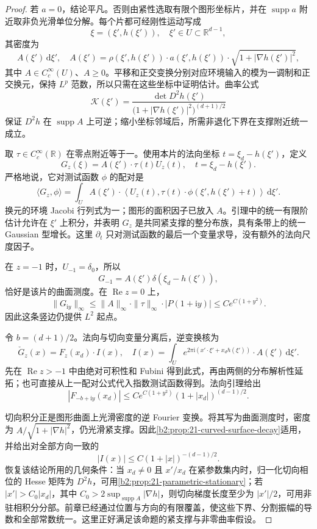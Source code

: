 \begin{proof}
若 \(a=0\)，结论平凡。否则由紧性选取有限个图形坐标片，并在 \(\operatorname{supp}a\) 附近取非负光滑单位分解。每个片都可经刚性运动写成
\[
 \xi=(\xi',h(\xi')),\quad \xi'\in U\subset\mathbb R^{d-1},
\]
其密度为
\[
 A(\xi')\,\mathrm d\xi',\quad
 A(\xi')=\rho(\xi',h(\xi'))\cdot
 a(\xi',h(\xi'))\cdot\sqrt{1+|\nabla h(\xi')|^2},
\]
其中 \(A\in C_c^\infty(U)\)、\(A\geq0\)。平移和正交变换分别对应环境输入的模为一调制和正交换元，保持 \(L^p\) 范数，所以只需在这些坐标中证明估计。曲率公式
\[
 \mathcal K(\xi')
 =\frac{\det D^2h(\xi')}
 {\bigl(1+|\nabla h(\xi')|^2\bigr)^{(d+1)/2}}
\]
保证 \(D^2h\) 在 \(\operatorname{supp}A\) 上可逆；缩小坐标邻域后，所需非退化下界在支撑附近统一成立。

取 \(\tau\in C_c^\infty(\mathbb R)\) 在零点附近等于一。使用本片的法向坐标
\(t=\xi_d-h(\xi')\)，定义
\[
 G_z(\xi)=A(\xi')\cdot\tau(t)U_z(t),
 \quad t=\xi_d-h(\xi').
\]
严格地说，它对测试函数 \(\phi\) 的配对是
\[
 \langle G_z,\phi\rangle
 =\int_U A(\xi')\cdot
 \left\langle U_z(t),
 \tau(t)\cdot\phi(\xi',h(\xi')+t)\right\rangle\,\mathrm d\xi'.
\]
换元的环境 Jacobi 行列式为一；图形的面积因子已放入 \(A\)。引理中的统一有限阶估计允许在 \(\xi'\) 上积分，并表明 \(G_z\) 是共同紧支撑的整分布族，具有条带上的统一 Gaussian 型增长。这里 \(\partial_t\) 只对测试函数的最后一个变量求导，没有额外的法向尺度因子。

在 \(z=-1\) 时，\(U_{-1}=\delta_0\)，所以
\[
 G_{-1}=A(\xi')\delta(\xi_d-h(\xi')),
\]
恰好是该片的曲面测度。在 \(\operatorname{Re}z=0\) 上，
\[
 \|G_{\mathrm iy}\|_\infty
 \leq\|A\|_\infty\cdot\|\tau\|_\infty
 \cdot|P(1+\mathrm iy)|
 \leq C e^{C(1+y^2)}.
\]
因此这条竖边仍提供 \(L^2\) 起点。

令 \(b=(d+1)/2\)。法向与切向变量分离后，逆变换核为
\[
 \check G_z(x)=F_z(x_d)\cdot I(x),
 \quad
 I(x)=\int_U e^{2\pi\mathrm i(x'\cdot\xi'+x_dh(\xi'))}
 \cdot A(\xi')\,\mathrm d\xi'.
\]
先在 \(\operatorname{Re}z>-1\) 中由绝对可积性和 Fubini 得到此式，再由两侧的分布解析性延拓；也可直接从上一配对公式代入指数测试函数得到。法向引理给出
\[
 |F_{-b+\mathrm iy}(x_d)|
 \leq C e^{C(1+y^2)}(1+|x_d|)^{(d-1)/2}.
\]

切向积分正是图形曲面上光滑密度的逆 Fourier 变换。将其写为曲面测度时，密度为 \(A/\sqrt{1+|\nabla h|^2}\)，仍光滑紧支撑。因此\cref{b2:prop:21-curved-surface-decay}适用，并给出对全部方向一致的
\[
 |I(x)|\leq C(1+|x|)^{-(d-1)/2}.
\]
恢复该结论所用的几何条件：当 \(x_d\ne0\) 且 \(x'/x_d\) 在紧参数集内时，归一化切向相位的 Hesse 矩阵为 \(D^2h\)，可用\cref{b2:prop:21-parametric-stationary}；若 \(|x'|>C_0|x_d|\)，其中 \(C_0>2\sup_{\operatorname{supp}A}|\nabla h|\)，则切向梯度长度至少为 \(|x'|/2\)，可用非驻相积分分部。前章已经通过位置与方向的有限覆盖，使这些下界、分割振幅的导数和全部常数统一。这里正好满足该命题的紧支撑与非零曲率假设。


\end{proof}
